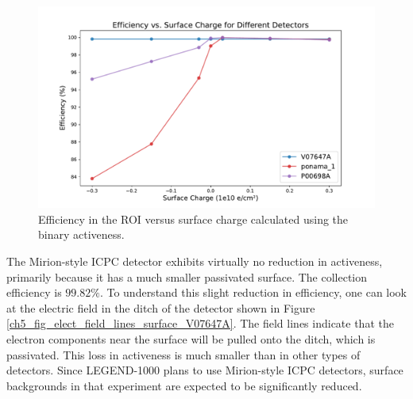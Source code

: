 \begin{figure}%
\centering
\includegraphics[trim={1.6cm 0.3cm 2cm 1.8cm},clip,width=\linewidth]{ch5/figs/efficiency_0nbb.pdf}
\caption{Efficiency in the ROI versus surface charge calculated using the binary activeness.}
\label{fig:efficiency_sc_plot}
\end{figure}

The Mirion-style ICPC detector exhibits virtually no reduction in activeness, primarily because it has a much smaller passivated surface. The collection efficiency is $99.82\%$. To understand this slight reduction in efficiency, one can look at the electric field in the ditch of the detector shown in Figure \ref{ch5_fig_elect_field_lines_surface_V07647A}. The field lines indicate that the electron components near the surface will be pulled onto the ditch, which is passivated. This loss in activeness is much smaller than in other types of detectors. Since LEGEND-1000 plans to use Mirion-style ICPC detectors, surface backgrounds in that experiment are expected to be significantly reduced.

